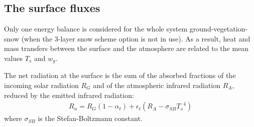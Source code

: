 \subsection{The surface fluxes}

Only one energy balance is considered for the whole system
ground-vegetation-snow (when the 3-layer snow scheme option is not in use).
As a result, heat and mass transfers between the surface and
the atmosphere are related to the mean values $T_s$ and $w_g$.

The net radiation at the surface is the sum of the absorbed
fractions of the incoming solar radiation $R_G$ and of the
atmospheric infrared radiation $R_A$, reduced by the emitted
infrared radiation:
\begin{eqnarray} \label{eqnRN}
R_n = R_G (1-\alpha_t) + \epsilon_t \left( R_A-\sigma_{SB}{T_s}^4 \right)
\end{eqnarray}
where $\sigma_{SB}$ is the Stefan-Boltzmann constant.

